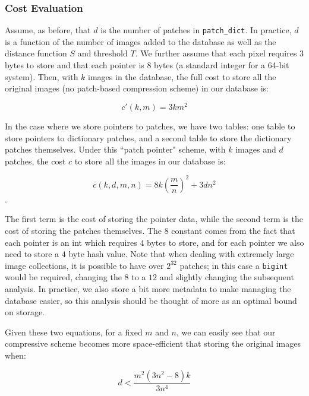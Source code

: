 \subsubsection{Cost Evaluation}
\label{sec:costeval}

Assume, as before, that $d$ is the number of patches in \texttt{patch\_dict}.  In practice, $d$ is a function of the number of images added to the database as well as the distance function $S$ and threshold $T$.  We further assume that each pixel requires 3 bytes to store and that each pointer is 8 bytes (a standard integer for a 64-bit system).  Then, with $k$ images in the database, the full cost to store all the original images (no patch-based compression scheme) in our database is:

\begin{equation}
	 c'(k, m) = 3  k  m^2
\end{equation}

\noindent In the case where we store pointers to patches, we have two tables: one table to store pointers to dictionary patches, and a second table to store the dictionary patches themselves.  Under this ``patch pointer" scheme, with $k$ images and $d$ patches, the cost $c$ to store all the images in our database is:

\begin{equation}
	c(k, d, m, n) = 8 k \left(\frac{m}{n}\right)^2 + 3  d  n^2
\end{equation}.

The first term is the cost of storing the pointer data, while the second term is the cost of storing the patches themselves.  The $8$ constant comes from the fact that each pointer is an int which requires $4$ bytes to store, and for each pointer we also need to store a $4$ byte hash value.  Note that when dealing with extremely large image collections, it is possible to have over $2^{32}$ patches; in this case a \texttt{bigint} would be required, changing the $8$ to a $12$ and slightly changing the subsequent analysis.  In practice, we also store a bit more metadata to make managing the database easier, so this analysis should be thought of more as an optimal bound on storage.

Given these two equations, for a fixed $m$ and $n$, we can easily see that our compressive scheme becomes more space-efficient that storing the original images when:

\begin{equation}
	d < \frac{m^2 (3n^2 - 8) k}{3n^4}
\end{equation}

